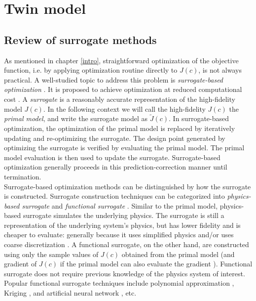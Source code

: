 \documentclass[a4paper,onecolumn]{article}
\theoremstyle{remark}
\begin{document}
\newpage
\section{Twin model}
\label{gradient_surrogate}
\subsection{Review of surrogate methods}
\label{review surrogate methods}
\noindent As mentioned in chapter \ref{intro}, 
straightforward optimization of the objective function, i.e. by applying
optimization routine directly to $J(c)$, is not always practical.
A well-studied topic to address this problem is \emph{surrogate-based optimization}
\cite{Opt Koziel Book, Surrogate based analysis and optimization}.
It is proposed to achieve optimization at reduced computational cost \cite{Space mapping 1}.
A \emph{surrogate} is a reasonably accurate representation of the high-fidelity model $J(c)$.
In the following context we will call the high-fidelity $J(c)$ the \emph{primal model},
and write the surrogate model as $\tilde{J}(c)$.
In surrogate-based optimization, the optimization of the primal model is
replaced by iteratively updating and re-optimizing the surrogate.
The design point generated by optimizing the surrogate is verified by evaluating
the primal model. The primal model evaluation is then used to update the surrogate.
Surrogate-based optimization generally proceeds in this prediction-correction manner until
termination.\\

\noindent Surrogate-based optimization methods can be distinguished by how the surrogate is 
constructed. Surrogate construction techniques can be categorized into
\emph{physics-based surrogate} and \emph{functional surrogate} \cite{Opt Koziel Book}.
Similar to the primal model, physics-based surrogate simulates the underlying physics.
The surrogate is still a representation of the underlying system's physics, but has 
lower fidelity and is cheaper to evaluate: generally because it
uses simplified physics \cite{simplified physics, Space mapping 1} and/or
uses coarse discretization \cite{coarse discretization}.
A functional surrogate, on the other hand, are constructed using only the sample
values of $J(c)$ obtained from the primal model (and gradient of $J(c)$ if
the primal model can also evaluate the gradient \cite{gradient kriging surrogate}).
Functional surrogate does not require previous knowledge of the physics system of interest. 
Popular functional surrogate techniques include polynomial approximation 
\cite{poly functional surrogate}, Kriging \cite{kriging functional surrogate},
and artificial neural network \cite{ann functional surrogate}, etc.\\
\end{document}

